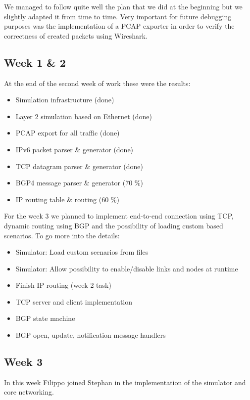 
We managed to follow quite well the plan that we did at the beginning but we slightly
adapted it from time to time. 
Very important for future debugging purposes was the implementation of a PCAP exporter
in order to verify the correctness of created packets using Wireshark.

\subsection{Week 1 \& 2}
At the end of the second week of work these were the results:

\begin{itemize}
    \item Simulation infrastructure (done)
    \item Layer 2 simulation based on Ethernet (done)
    \item PCAP export for all traffic (done)
    \item IPv6 packet parser \& generator (done)
    \item TCP datagram parser \& generator (done)
    \item BGP4 message parser \& generator (70 \%)
    \item IP routing table \& routing (60 \%)
\end{itemize}

For the week 3 we planned to implement end-to-end connection using TCP, dynamic routing
using BGP and the possibility of loading custom based scenarios. 
To go more into the details:

\begin{itemize}
    \item Simulator: Load custom scenarios from files
    \item Simulator: Allow possibility to enable/disable links and nodes at runtime
    \item Finish IP routing (week 2 task)
    \item TCP server and client implementation
    \item BGP state machine
    \item BGP open, update, notification message handlers
\end{itemize}

\subsection{Week 3}
In this week Filippo joined Stephan in the implementation of the simulator and
core networking.

